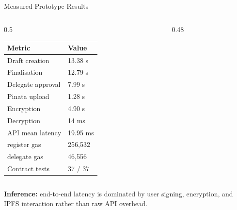 \documentclass[10pt]{beamer}
\begin{document}
\begin{frame}{Measured Prototype Results}
\small
\begin{columns}[T]
\begin{column}{0.5\textwidth}
\begin{tabular}{@{}ll@{}}
\toprule
\textbf{Metric} & \textbf{Value} \\
\midrule
Draft creation & 13.38 s \\
Finalisation & 12.79 s \\
Delegate approval & 7.99 s \\
Pinata upload & 1.28 s \\
Encryption & 4.90 s \\
Decryption & 14 ms \\
API mean latency & 19.95 ms \\
register gas & 256,532 \\
delegate gas & 46,556 \\
Contract tests & 37 / 37 \\
\bottomrule
\end{tabular}
\end{column}

\begin{column}{0.48\textwidth}
\end{column}
\end{columns}

\vspace{0.1cm}
\footnotesize
\textbf{Inference:} end-to-end latency is dominated by user signing, encryption, and IPFS interaction rather than raw API overhead.
\end{frame}
\end{document}
